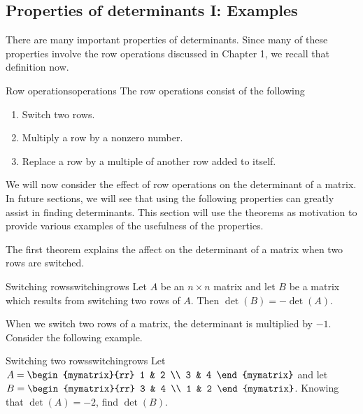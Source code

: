 \subsection{Properties of determinants I: Examples}

There are many important properties of determinants. Since many of these properties involve
the row operations discussed in Chapter 1, we recall that definition now. 

\begin{definition}{Row operations}{operations}
The row operations
consist of the following

\begin{enumerate}
\item Switch two rows.

\item Multiply a row by a nonzero number.

\item Replace a row by a multiple of another row added to itself.
\end{enumerate}
\end{definition}

We will now consider the effect of row operations on the determinant of a matrix. In future sections, we will see that using the following properties can 
greatly assist in finding determinants. This section will use the theorems as motivation to provide various examples of the usefulness of the properties. 

The first theorem explains the affect on the determinant of a matrix when two rows are switched. 

\begin{theorem}{Switching rows}{switchingrows}
Let $A$ be an $n\times n$ matrix and let $B$ be a matrix
which results from switching two rows of $A.$ Then $\det \left( B\right)
= - \det \left( A\right) .$ 
\end{theorem}

When we switch two rows of a matrix, the determinant is multiplied by $-1$. Consider the following example.

\begin{example}{Switching two rows}{switchingrows}
Let $A=\begin{mymatrix}{rr}
1 & 2 \\
3 & 4
\end{mymatrix} $ and let $B=\begin{mymatrix}{rr}
3 & 4 \\
1 & 2
\end{mymatrix} $. 
Knowing that $\det \left( A \right) =-2$, find $\det \left( B \right) $.
\end{example}

